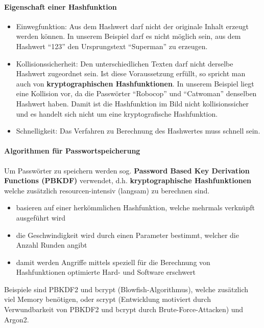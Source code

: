 \documentclass[10pt,a4paper]{article}
\begin{document}
\paragraph*{Eigenschaft einer Hashfunktion}
\begin{itemize}[noitemsep,topsep=0pt,leftmargin=*]
    \item Einwegfunktion: Aus dem Hashwert darf nicht der originale Inhalt erzeugt werden können. In unserem Beispiel darf es nicht möglich sein, aus dem Hashwert "`123"' den Ursprungstext "`Superman"' zu erzeugen.
    \item Kollisionssicherheit: Den unterschiedlichen Texten darf nicht derselbe Hashwert zugeordnet sein. Ist diese Voraussetzung erfüllt, so spricht man auch von \textbf{kryptographischen Hashfunktionen}. In unserem Beispiel liegt eine Kollision vor, da die Passwörter "`Robocop"' und "`Catwoman"' denselben Hashwert haben. Damit ist die Hashfunktion im Bild nicht kollisionssicher und es handelt sich nicht um eine kryptografische Hashfunktion.
    \item Schnelligkeit: Das Verfahren zu Berechnung des Hashwertes muss schnell sein.
\end{itemize}

\paragraph*{Algorithmen für Passwortspeicherung}Um Passwörter zu speichern werden sog. \textbf{Password Based Key Derivation Functions (PBKDF)} verwendet, d.h. \textbf{kryptographische Hashfunktionen} welche zusätzlich resourcen-intensiv (langsam) zu berechnen sind.
\begin{itemize}[noitemsep,topsep=0pt,leftmargin=*]
    \item basieren auf einer herkömmlichen Hashfunktion, welche mehrmals verknüpft ausgeführt wird
    \item die Geschwindigkeit wird durch einen Parameter bestimmt, welcher die Anzahl Runden angibt
    \item damit werden Angriffe mittels speziell für die Berechnung von Hashfunktionen optimierte Hard- und Software erschwert
\end{itemize}
Beispiele sind PBKDF2 und bcrypt (Blowfish-Algorithmus), welche zusätzlich viel Memory benötigen, oder scrypt (Entwicklung motiviert durch Verwundbarkeit von PBKDF2 und bcrypt durch Brute-Force-Attacken) und Argon2.
\end{document}
